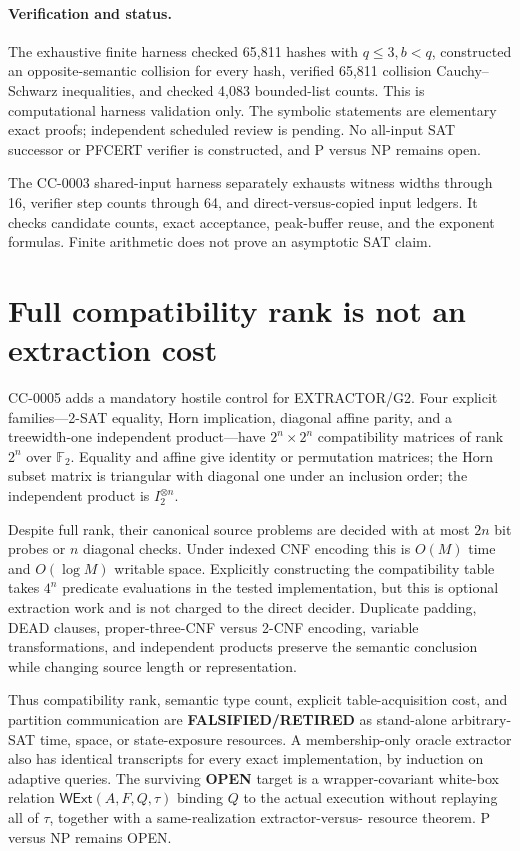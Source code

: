 \documentclass[11pt]{article}
\begin{document}
\paragraph{Verification and status.}
The exhaustive finite harness checked 65,811 hashes with \(q\le3,b<q\),
constructed an opposite-semantic collision for every hash, verified 65,811
collision Cauchy--Schwarz inequalities, and checked 4,083 bounded-list
counts. This is computational harness validation only. The symbolic
statements are elementary exact proofs; independent scheduled review is
pending. No all-input SAT successor or PFCERT verifier is constructed, and
P versus NP remains open.

The CC-0003 shared-input harness separately exhausts witness widths through
16, verifier step counts through 64, and direct-versus-copied input ledgers.
It checks candidate counts, exact acceptance, peak-buffer reuse, and the
exponent formulas.  Finite arithmetic does not prove an asymptotic SAT claim.

\section{Full compatibility rank is not an extraction cost}
CC-0005 adds a mandatory hostile control for EXTRACTOR/G2.  Four explicit
families---2-SAT equality, Horn implication, diagonal affine parity, and a
treewidth-one independent product---have $2^n\times2^n$ compatibility
matrices of rank $2^n$ over $\mathbb F_2$.  Equality and affine give identity
or permutation matrices; the Horn subset matrix is triangular with diagonal
one under an inclusion order; the independent product is $I_2^{\otimes n}$.

Despite full rank, their canonical source problems are decided with at most
$2n$ bit probes or $n$ diagonal checks.  Under indexed CNF encoding this is
$O(M)$ time and $O(\log M)$ writable space.  Explicitly constructing the
compatibility table takes $4^n$ predicate evaluations in the tested
implementation, but this is optional extraction work and is not charged to
the direct decider.  Duplicate padding, DEAD clauses, proper-three-CNF versus
2-CNF encoding, variable transformations, and independent products preserve
the semantic conclusion while changing source length or representation.

Thus compatibility rank, semantic type count, explicit table-acquisition
cost, and partition communication are \textbf{FALSIFIED/RETIRED} as
stand-alone arbitrary-SAT time, space, or state-exposure resources.  A
membership-only oracle extractor also has identical transcripts for every
exact implementation, by induction on adaptive queries.  The surviving
\textbf{OPEN} target is a wrapper-covariant white-box relation
$\mathsf{WExt}(A,F,Q,\tau)$ binding $Q$ to the actual execution without
replaying all of $\tau$, together with a same-realization extractor-versus-
resource theorem.  P versus NP remains OPEN.
\end{document}
